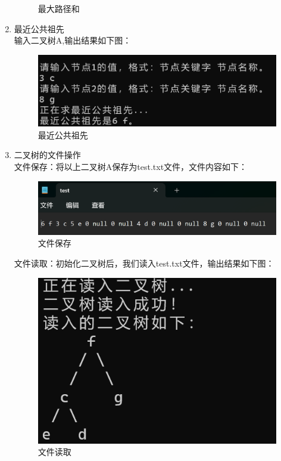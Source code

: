\documentclass[supercite]{Experimental_Report}
\theoremstyle{definition}
\begin{document}
\begin{enumerate}
\begin{figure}[H]
		\caption{最大路径和}
		\label{fig2-25}
	\end{figure}
	\item 最近公共祖先\\
		输入二叉树A,输出结果如下图：
		\begin{figure}[H]
			\centering
			\includegraphics[width=0.9\linewidth]{images/求lca成功.png}
			\caption{最近公共祖先}
			\label{fig2-26}
		\end{figure}
		
\item 二叉树的文件操作\\
文件保存：将以上二叉树A保存为test.txt文件，文件内容如下：
\begin{figure}[H]
	\centering
	\includegraphics[width=0.9\linewidth]{images/二叉树文件保存.png}
	\caption{文件保存}
	\label{fig2-27}
\end{figure}

文件读取：初始化二叉树后，我们读入test.txt文件，输出结果如下图：
\begin{figure}[H]
	\centering
	\includegraphics[width=0.9\linewidth]{images/二叉树读取成功.png}
	\caption{文件读取}
	\label{fig2-28}
\end{figure}


\end{enumerate}
\end{document}
